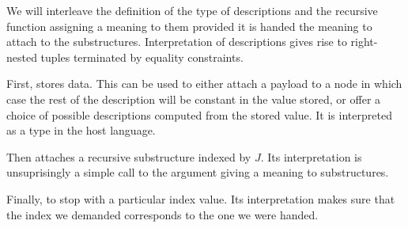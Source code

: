 We will interleave the definition of the type of descriptions and the
recursive function  assigning a meaning to them provided it
is handed the meaning to attach to the substructures. Interpretation
of descriptions gives rise to right-nested tuples terminated by equality
constraints.

\noindent\begin{minipage}{0.5\textwidth}
\end{minipage}\begin{minipage}{0.5\textwidth}
\end{minipage}

First,  stores data. This can be used to either attach a payload
to a node in which case the rest of the description will be constant in
the value stored, or offer a choice of possible descriptions computed
from the stored value. It is interpreted as a  type in the host language.

\noindent\begin{minipage}[t]{0.5\textwidth}
\end{minipage}\begin{minipage}[t]{0.5\textwidth}
\end{minipage}

Then  attaches a recursive substructure indexed by $J$. Its
interpretation is unsuprisingly a simple call to the argument giving
a meaning to substructures.

\noindent\begin{minipage}{0.5\textwidth}
\end{minipage}\begin{minipage}{0.5\textwidth}
\end{minipage}

Finally,  to stop with a particular index value.
Its interpretation makes sure that the index we demanded corresponds
to the one we were handed.

\noindent\begin{minipage}{0.5\textwidth}
\end{minipage}\begin{minipage}{0.5\textwidth}
\end{minipage}

